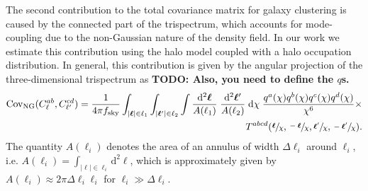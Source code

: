 \documentclass[a4paper,11pt]{article}
\newcommand{\todo}[1]{{\bf TODO: #1}}
\begin{document}
    The second contribution to the total covariance matrix for galaxy clustering is caused by the connected part of the trispectrum, which accounts for mode-coupling due to the non-Gaussian nature of the density field. In our work we estimate this contribution using the halo model coupled with a halo occupation distribution. In general, this contribution is given by the angular projection of the three-dimensional trispectrum as \todo{Also, you need to define the $q$s.}
    \begin{align}
      \mathrm{Cov}_{\mathrm{NG}}(C^{ab}_{\ell}, C^{cd}_{\ell'}) = \frac{1}{4 \pi f_{\mathrm{sky}}} \int_{\vert \boldsymbol{\ell} \vert \in \ell_{1}} \int_{\vert \boldsymbol{\ell}' \vert \in \ell_{2}} \int \frac{\mathrm{d}^{2}\boldsymbol{\ell}}{A(\ell_{1})} \; \frac{\mathrm{d}^{2}\boldsymbol{\ell}'}{A(\ell_{2})} \; \mathrm{d}\chi \; \frac{q^{a}(\chi)q^{b}(\chi)q^{c}(\chi)q^{d}(\chi)}{\chi^{6}} \times \\ T^{abcd}(\sfrac{\boldsymbol{\ell}}{\chi}, \sfrac{-\boldsymbol{\ell}}{\chi}, \sfrac{\boldsymbol{\ell}'}{\chi}, \sfrac{-\boldsymbol{\ell}'}{\chi}).
    \end{align}
    The quantity $A(\ell_{i})$ denotes the area of an annulus of width $\Delta \ell_{i}$ around $\ell_{i}$, i.e. $A(\ell_{i}) = \int_{\vert \boldsymbol{\ell} \vert \in \ell_{i}} \mathrm{d}^{2}\boldsymbol{\ell}$, which is approximately given by $A(\ell_{i}) \approx 2 \pi \Delta \ell_{i} \ell_{i}$ for $\ell_{i} \gg \Delta \ell_{i}$.
    
\end{document}
